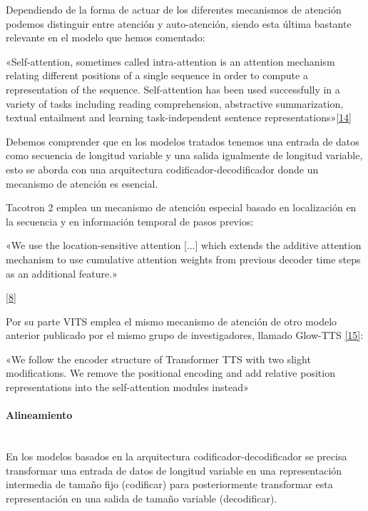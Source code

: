 Dependiendo de la forma de actuar de los diferentes mecanismos de atención podemos distinguir entre atención y auto-atención, siendo esta última bastante relevante en el modelo que hemos comentado:

\begin{displayquote}
«Self-attention, sometimes called intra-attention is an attention mechanism relating different positions of a single sequence in order to compute a representation of the sequence. Self-attention has been used successfully in a variety of tasks including reading comprehension, abstractive summarization, textual entailment and learning task-independent sentence representations»\hyperref[RES_1]{[14]}
\end{displayquote}

Debemos comprender que en los modelos tratados tenemos una entrada de datos como secuencia de longitud variable y una salida igualmente de longitud variable, esto se aborda con una arquitectura codificador-decodificador donde un mecanismo de atención es esencial.

Tacotron 2 emplea un mecanismo de atención especial basado en localización en la secuencia y en información temporal de pasos previos:

\begin{displayquote}
«We use the location-sensitive attention [...] which extends the additive attention mechanism to use cumulative attention weights from previous decoder time steps as an additional feature.»
\end{displayquote} \hyperref[EA_6]{[8]}

Por su parte VITS emplea el mismo mecanismo de atención de otro modelo anterior publicado por el mismo grupo de investigadores, llamado Glow-TTS \hyperref[RES_1]{[15]}:

\begin{displayquote}
«We follow the encoder structure of Transformer TTS with two slight modifications. We remove the positional encoding and add relative position representations into the self-attention modules instead»
\end{displayquote}

\paragraph{Alineamiento} ~\\

En los modelos basados en la arquitectura codificador-decodificador se precisa transformar una entrada de datos de longitud variable en una representación intermedia de tamaño fijo (codificar) para posteriormente transformar esta representación en una salida de tamaño variable (decodificar).

